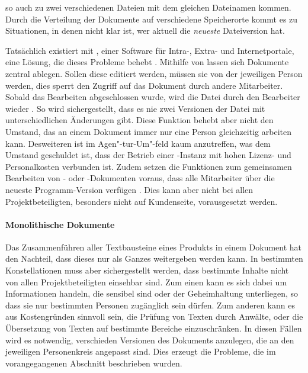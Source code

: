 so auch zu zwei verschiedenen Dateien mit dem gleichen Dateinamen kommen. Durch die Verteilung der Dokumente auf verschiedene Speicherorte kommt es zu Situationen, in denen nicht klar ist, wer aktuell die \emph{neueste} Dateiversion hat.

Tatsächlich existiert mit  , einer Software für Intra-, Extra- und Internetportale, eine Lösung, die dieses Probleme behebt \cite{sharepoint-shared-documents}. Mithilfe von  lassen sich Dokumente zentral ablegen. Sollen diese editiert werden, müssen sie von der jeweiligen Person  werden, dies sperrt den Zugriff auf das Dokument durch andere Mitarbeiter. Sobald das Bearbeiten abgeschlossen wurde, wird die Datei durch den Bearbeiter wieder . So wird sichergestellt, dass es nie zwei Versionen der Datei mit unterschiedlichen Änderungen gibt. Diese Funktion behebt aber nicht den Umstand, das an einem Dokument immer nur eine Person gleichzeitig arbeiten kann. Desweiteren ist  im Agen"-tur-Um"-feld kaum anzutreffen, was dem Umstand geschuldet ist, dass der Betrieb einer -Instanz mit hohen Lizenz- und Personalkosten verbunden ist. Zudem setzen die Funktionen zum gemeinsamen Bearbeiten von - oder -Dokumenten voraus, dass alle Mitarbeiter über die neueste Programm-Version verfügen \cite{sharepoint-wordversions}. Dies kann aber nicht bei allen Projektbeteiligten, besonders nicht auf Kundenseite, vorausgesetzt werden.

\paragraph{Monolithische Dokumente} Das Zusammenführen aller Textbausteine eines Produkts in einem Dokument hat den Nachteil, dass dieses nur als Ganzes weitergeben werden kann. In bestimmten Konstellationen muss aber sichergestellt werden, dass bestimmte Inhalte nicht von allen Projektbeteiligten einsehbar sind. Zum einen kann es sich dabei um Informationen handeln, die sensibel sind oder der Geheimhaltung unterliegen, so dass sie nur bestimmten Personen zugänglich sein dürfen. Zum anderen kann es aus Kostengründen sinnvoll sein, die Prüfung von Texten durch Anwälte, oder die Übersetzung von Texten auf bestimmte Bereiche einzuschränken. In diesen Fällen wird es notwendig, verschieden Versionen des Dokuments anzulegen, die an den jeweiligen Personenkreis angepasst sind. Dies erzeugt die Probleme, die im vorangegangenen Abschnitt beschrieben wurden.

